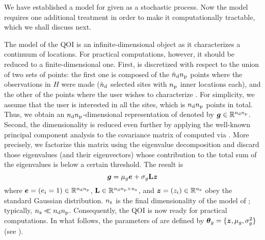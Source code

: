 We have established a model for \g given as a stochastic process. Now the
model requires one additional treatment in order to make it computationally
tractable, which we shall discuss next.

The model of the \ac{QOI} is an infinite-dimensional object as it characterizes
a continuum of locations. For practical computations, however, it should be
reduced to a finite-dimensional one. First, \g is discretized with respect to
the union of two sets of points: the first one is composed of the ${\hat{n}_\mathrm{d}} {n_\mathrm{p}}$
points where the observations in $H$ were made (${\hat{n}_\mathrm{d}}$ selected sites with ${n_\mathrm{p}}$
inner locations each), and the other of the points where the user wishes to
characterize \g. For simplicity, we assume that the user is interested in all
the sites, which is ${n_\mathrm{d}} {n_\mathrm{p}}$ points in total. Thus, we obtain an ${n_\mathrm{d}}
{n_\mathrm{p}}$-dimensional representation of \g denoted by $\boldsymbol{g} \in \mathbb{R}^{{n_\mathrm{d}} {n_\mathrm{p}}}$.
Second, the dimensionality is reduced even further by applying the well-known
principal component analysis to the covariance matrix of \vg computed via
. More precisely, we factorize this matrix using the
eigenvalue decomposition \cite{press2007} and discard those eigenvalues (and
their eigenvectors) whose contribution to the total sum of the eigenvalues is
below a certain threshold. The result is
\begin{equation} \elab{kl-approximation}
  \vg = \mu_\g \v{e} + \sigma_\g \m{L} \vz
\end{equation}
where $\boldsymbol{e} = (e_i = 1) \in \mathbb{R}^{{n_\mathrm{d}} {n_\mathrm{p}}}$, $\mathbf{L} \in \mathbb{R}^{{n_\mathrm{d}} {n_\mathrm{p}} \times
{n_\mathrm{z}}}$, and $\boldsymbol{z} = (z_i) \in \mathbb{R}^{n_\mathrm{z}}$ obey the standard Gaussian distribution.
${n_\mathrm{z}}$ is the final dimensionality of the model of \g; typically, ${n_\mathrm{z}} \ll {n_\mathrm{d}}
{n_\mathrm{p}}$. Consequently, the \ac{QOI} is now ready for practical computations. In
what follows, the parameters of  are defined by $\boldsymbol{\theta}_g = \{ \boldsymbol{z},
\mu_g, \sigma^2_g \}$ (see ).

